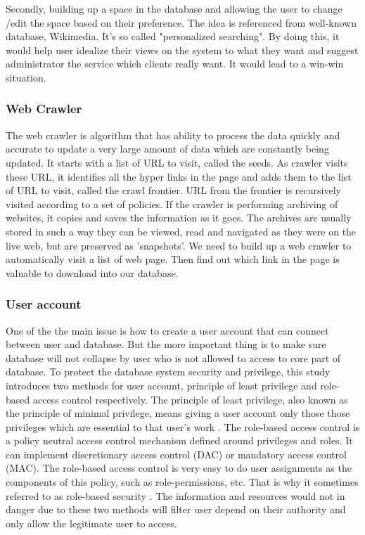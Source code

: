 Secondly, building up a space in the database and allowing the user to change /edit the space based on their preference. The idea is referenced from well-known database, Wikimedia. It's so called "personalized searching".  By doing this, it would help user idealize their views on the system to what they want and suggest administrator the service which clients really want. It would lead to a win-win situation. 
	
	
\subsubsection*{Web Crawler}
The web crawler is algorithm that has ability to process the data quickly and accurate to update a very large amount of data which are constantly being updated.\cite{Liu2012} It starts with a list of URL to visit, called the seeds. As crawler visits these URL, it identifies all the hyper links in the page and adds them to the list of URL to visit, called the crawl frontier. URL from the frontier is recursively visited according to a set of policies. If the crawler is performing archiving of websites, it copies and saves the information as it goes. The archives are usually stored in such a way they can be viewed, read and navigated as they were on the live web, but are preserved as 'snapshots'.\cite{Du2013} We need to build up a web crawler to automatically visit a list of web page. Then find out which link in the page is valuable to download into our database.
	
	
\subsubsection*{User account}
One of the the main issue is how to create a user account that can connect between user and database. But the more important thing is to make sure database will not collapse by user who is not allowed to access to core part of database. 
 To protect the database system security and privilege, this study introduces two methods for user account, principle of least privilege and role-based access control respectively. The principle of least privilege, also known as the principle of minimal privilege, means giving a user account only those those privileges which are essential to that user's work \cite{PrincipleLeastPrivilege}. The role-based access control is a policy neutral access control mechanism defined around privileges and roles. It can implement discretionary access control (DAC) or mandatory access control (MAC). The role-based access control is very easy to do user assignments as the components of this policy, such as role-permissions, etc. That is why it sometimes referred to as role-based security \cite{RoleBasedAccessControl}. The information and resources would not in danger due to these two methods will filter user depend on their authority and only allow the legitimate user to access. 
	
